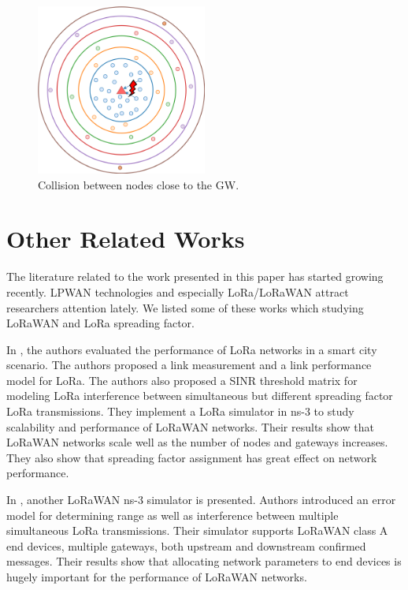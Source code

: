 \documentclass[conference]{IEEEtran}
\begin{document}
\begin{figure}
\centering
\includegraphics[width=0.5\textwidth]{lora1}
\caption{Collision between nodes close to the GW.}
\label{fig:problem2}
\end{figure}


\section{Other Related Works} \label{Other Related Works}
The literature related to the work presented in this paper has started growing recently. LPWAN technologies and especially LoRa/LoRaWAN attract researchers attention lately. We listed some of these works which studying  LoRaWAN and LoRa spreading factor.

\par In \cite{7996384}, the authors evaluated the performance of LoRa networks in a smart city scenario. The
authors proposed a link measurement and a link performance model for LoRa. The authors also proposed a SINR threshold matrix for modeling LoRa interference between simultaneous but different spreading factor LoRa transmissions. They implement a LoRa simulator in ns-3 to study scalability and performance of LoRaWAN networks. Their results show that LoRaWAN networks scale well as the number of nodes and gateways increases. They also show that spreading factor assignment has great effect on network performance.

\par In \cite{8090518}, another LoRaWAN ns-3 simulator is presented. Authors introduced an error model for determining range as well as interference between multiple simultaneous LoRa transmissions. Their simulator supports LoRaWAN class A end devices, multiple gateways, both upstream and downstream confirmed messages. Their results show that allocating network parameters to end devices is hugely important for the performance of LoRaWAN networks.
\end{document}
